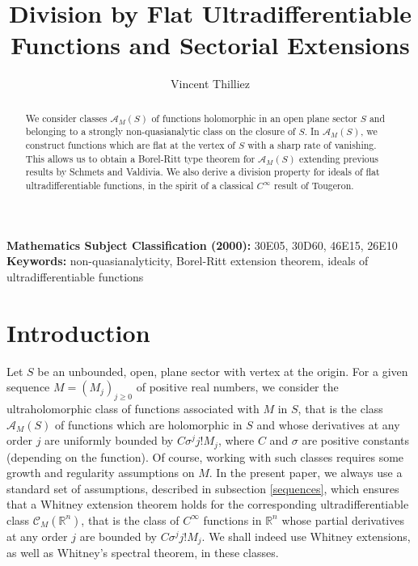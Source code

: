 \documentclass[a4paper]{amsart}
\title[Division by Flat Functions and Sectorial Extensions]{Division by Flat Ultradifferentiable Functions and Sectorial Extensions}
\author{Vincent Thilliez}
\date{}
\theoremstyle{plain}
\theoremstyle{definition}
\theoremstyle{remark}
\begin{document}
\begin{abstract}
We consider classes $ \mathcal{A}_M(S) $ of functions holomorphic in an open plane sector $ S $ and belonging to a strongly non-quasianalytic class on the closure of $ S $. In $ \mathcal{A}_M(S) $, we construct functions which are flat at the vertex of $ S $ with a sharp rate of vanishing. This allows us to obtain a Borel-Ritt type theorem for $ \mathcal{A}_M(S) $ extending previous results by Schmets and Valdivia. We also derive a division property for ideals of flat ultradifferentiable functions, in the spirit of a classical $ C^\infty $ result of Tougeron.
\end{abstract}

\maketitle


\begin{footnotesize}
\noindent\textbf{Mathematics Subject Classification (2000):} 30E05, 30D60, 46E15, 26E10\\
\noindent\textbf{Keywords:} non-quasianalyticity, Borel-Ritt extension theorem, ideals of ultradifferentiable functions
\end{footnotesize}

\section*{Introduction}

Let $ S $ be an unbounded, open, plane sector with vertex at the origin. For a given sequence $ M=(M_j)_{j\geq 0} $ of positive real numbers, we consider the ultraholomorphic class of functions associated with $ M $ in $ S $, that is the class $ \mathcal{A}_M(S) $ of functions which are holomorphic in $ S $ and whose derivatives at any order $ j $ are uniformly bounded by $ C\sigma^jj!M_j $, where
$ C $ and $ \sigma $ are positive constants (depending on the function). Of course, working with such classes requires some growth and regularity assumptions on $ M $. In the present paper, we always use a standard set of assumptions, described in subsection \ref{sequences}, which ensures that a Whitney extension theorem holds for the corresponding ultradifferentiable class
$ \mathcal{C}_M(\mathbb{R}^n) $, that is the class of $ C^\infty $ functions in $ \mathbb{R}^n $ whose partial derivatives at any order $ j $ are bounded by
$ C\sigma^jj!M_j $. We shall indeed use Whitney extensions, as well as Whitney's spectral theorem, in these classes. 
\end{document}
